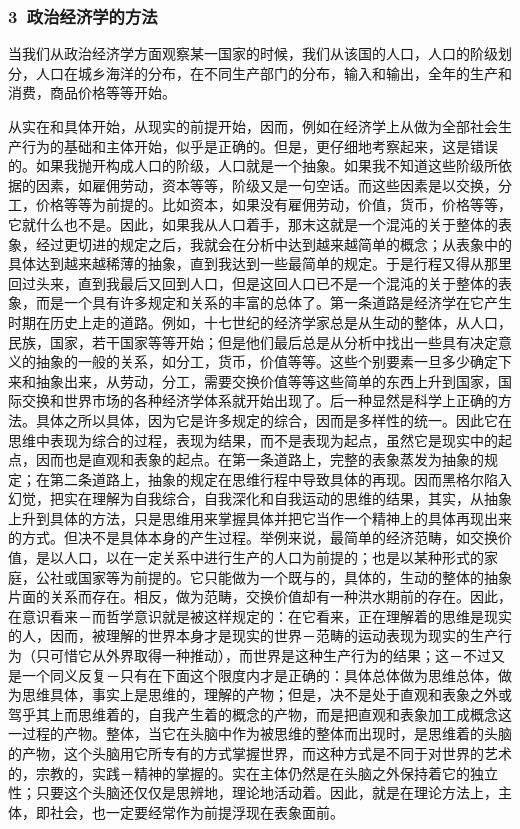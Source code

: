 \documentclass[a4paper,twoside,12pt,AutoFakeBold]{ctexart}
\begin{document}
\subsubsection{3~政治经济学的方法}

当我们从政治经济学方面观察某一国家的时候，我们从该国的人口，人口的阶级划分，人口在城乡海洋的分布，在不同生产部门的分布，输入和输出，全年的生产和消费，商品价格等等开始。

从实在和具体开始，从现实的前提开始，因而，例如在经济学上从做为全部社会生产行为的基础和主体开始，似乎是正确的。但是，更仔细地考察起来，这是错误的。如果我抛开构成人口的阶级，人口就是一个抽象。如果我不知道这些阶级所依据的因素，如雇佣劳动，资本等等，阶级又是一句空话。而这些因素是以交换，分工，价格等等为前提的。比如资本，如果没有雇佣劳动，价值，货币，价格等等，它就什么也不是。因此，如果我从人口着手，那末这就是一个混沌的关于整体的表象，经过更切进的规定之后，我就会在分析中达到越来越简单的概念；从表象中的具体达到越来越稀薄的抽象，直到我达到一些最简单的规定。于是行程又得从那里回过头来，直到我最后又回到人口，但是这回人口已不是一个混沌的关于整体的表象，而是一个具有许多规定和关系的丰富的总体了。第一条道路是经济学在它产生时期在历史上走的道路。例如，十七世纪的经济学家总是从生动的整体，从人口，民族，国家，若干国家等等开始；但是他们最后总是从分析中找出一些具有决定意义的抽象的一般的关系，如分工，货币，价值等等。这些个别要素一旦多少确定下来和抽象出来，从劳动，分工，需要交换价值等等这些简单的东西上升到国家，国际交换和世界市场的各种经济学体系就开始出现了。后一种显然是科学上正确的方法。具体之所以具体，因为它是许多规定的综合，因而是多样性的统一。因此它在思维中表现为综合的过程，表现为结果，而不是表现为起点，虽然它是现实中的起点，因而也是直观和表象的起点。在第一条道路上，完整的表象蒸发为抽象的规定；在第二条道路上，抽象的规定在思维行程中导致具体的再现。因而黑格尔陷入幻觉，把实在理解为自我综合，自我深化和自我运动的思维的结果，其实，从抽象上升到具体的方法，只是思维用来掌握具体并把它当作一个精神上的具体再现出来的方式。但决不是具体本身的产生过程。举例来说，最简单的经济范畴，如交换价值，是以人口，以在一定关系中进行生产的人口为前提的；也是以某种形式的家庭，公社或国家等为前提的。它只能做为一个既与的，具体的，生动的整体的抽象片面的关系而存在。相反，做为范畴，交换价值却有一种洪水期前的存在。因此，在意识看来－而哲学意识就是被这样规定的：在它看来，正在理解着的思维是现实的人，因而，被理解的世界本身才是现实的世界－范畴的运动表现为现实的生产行为（只可惜它从外界取得一种推动），而世界是这种生产行为的结果；这－不过又是一个同义反复－只有在下面这个限度内才是正确的：具体总体做为思维总体，做为思维具体，事实上是思维的，理解的产物；但是，决不是处于直观和表象之外或驾乎其上而思维着的，自我产生着的概念的产物，而是把直观和表象加工成概念这一过程的产物。整体，当它在头脑中作为被思维的整体而出现时，是思维着的头脑的产物，这个头脑用它所专有的方式掌握世界，而这种方式是不同于对世界的艺术的，宗教的，实践－精神的掌握的。实在主体仍然是在头脑之外保持着它的独立性；只要这个头脑还仅仅是思辨地，理论地活动着。因此，就是在理论方法上，主体，即社会，也一定要经常作为前提浮现在表象面前。
\end{document}
